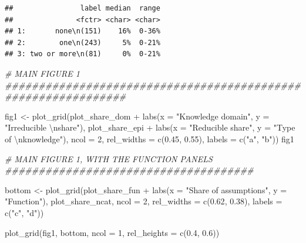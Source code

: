 \documentclass[
  11pt,
]{article}
\newenvironment{Shaded}{\begin{snugshade}}{\end{snugshade}}
\newcommand{\AttributeTok}[1]{\textcolor[rgb]{0.77,0.63,0.00}{#1}}
\newcommand{\CommentTok}[1]{\textcolor[rgb]{0.56,0.35,0.01}{\textit{#1}}}
\newcommand{\DecValTok}[1]{\textcolor[rgb]{0.00,0.00,0.81}{#1}}
\newcommand{\FloatTok}[1]{\textcolor[rgb]{0.00,0.00,0.81}{#1}}
\newcommand{\FunctionTok}[1]{\textcolor[rgb]{0.00,0.00,0.00}{#1}}
\newcommand{\NormalTok}[1]{#1}
\newcommand{\OtherTok}[1]{\textcolor[rgb]{0.56,0.35,0.01}{#1}}
\newcommand{\SpecialCharTok}[1]{\textcolor[rgb]{0.00,0.00,0.00}{#1}}
\newcommand{\StringTok}[1]{\textcolor[rgb]{0.31,0.60,0.02}{#1}}
\begin{document}
\begin{verbatim}
##                label median  range
##               <fctr> <char> <char>
## 1:       none\n(151)    16%  0-36%
## 2:        one\n(243)     5%  0-21%
## 3: two or more\n(81)     0%  0-21%
\end{verbatim}

\begin{Shaded}
\begin{Highlighting}[]
\CommentTok{\# MAIN FIGURE 1 \#\#\#\#\#\#\#\#\#\#\#\#\#\#\#\#\#\#\#\#\#\#\#\#\#\#\#\#\#\#\#\#\#\#\#\#\#\#\#\#\#\#\#\#\#\#\#\#\#\#\#\#\#\#\#\#\#\#\#\#\#\#}

\NormalTok{fig1 }\OtherTok{\textless{}{-}} \FunctionTok{plot\_grid}\NormalTok{(plot\_share\_dom }\SpecialCharTok{+} 
                    \FunctionTok{labs}\NormalTok{(}\AttributeTok{x =} \StringTok{"Knowledge domain"}\NormalTok{, }\AttributeTok{y =} \StringTok{"Irreducible }\SpecialCharTok{\textbackslash{}n}\StringTok{share"}\NormalTok{),}
\NormalTok{                  plot\_share\_epi }\SpecialCharTok{+} 
                    \FunctionTok{labs}\NormalTok{(}\AttributeTok{x =} \StringTok{"Reducible share"}\NormalTok{, }\AttributeTok{y =} \StringTok{"Type of }\SpecialCharTok{\textbackslash{}n}\StringTok{knowledge"}\NormalTok{), }
                  \AttributeTok{ncol =} \DecValTok{2}\NormalTok{, }\AttributeTok{rel\_widths =} \FunctionTok{c}\NormalTok{(}\FloatTok{0.45}\NormalTok{, }\FloatTok{0.55}\NormalTok{),}
          \AttributeTok{labels =} \FunctionTok{c}\NormalTok{(}\StringTok{"a"}\NormalTok{, }\StringTok{"b"}\NormalTok{))}
\NormalTok{fig1}
\end{Highlighting}
\end{Shaded}

\begin{Shaded}
\begin{Highlighting}[]
\CommentTok{\# MAIN FIGURE 1, WITH THE FUNCTION PANELS \#\#\#\#\#\#\#\#\#\#\#\#\#\#\#\#\#\#\#\#\#\#\#\#\#\#\#\#\#\#\#\#\#\#\#\#\#}

\NormalTok{bottom }\OtherTok{\textless{}{-}} \FunctionTok{plot\_grid}\NormalTok{(plot\_share\_fun }\SpecialCharTok{+} 
                      \FunctionTok{labs}\NormalTok{(}\AttributeTok{x =} \StringTok{"Share of assumptions"}\NormalTok{, }
                           \AttributeTok{y =} \StringTok{"Function"}\NormalTok{), plot\_share\_ncat, }\AttributeTok{ncol =} \DecValTok{2}\NormalTok{, }\AttributeTok{rel\_widths =} \FunctionTok{c}\NormalTok{(}\FloatTok{0.62}\NormalTok{, }\FloatTok{0.38}\NormalTok{),  }\AttributeTok{labels =} \FunctionTok{c}\NormalTok{(}\StringTok{"c"}\NormalTok{, }\StringTok{"d"}\NormalTok{))}

\FunctionTok{plot\_grid}\NormalTok{(fig1, bottom, }\AttributeTok{ncol =} \DecValTok{1}\NormalTok{, }\AttributeTok{rel\_heights =} \FunctionTok{c}\NormalTok{(}\FloatTok{0.4}\NormalTok{, }\FloatTok{0.6}\NormalTok{))}
\end{Highlighting}
\end{Shaded}
\end{document}
